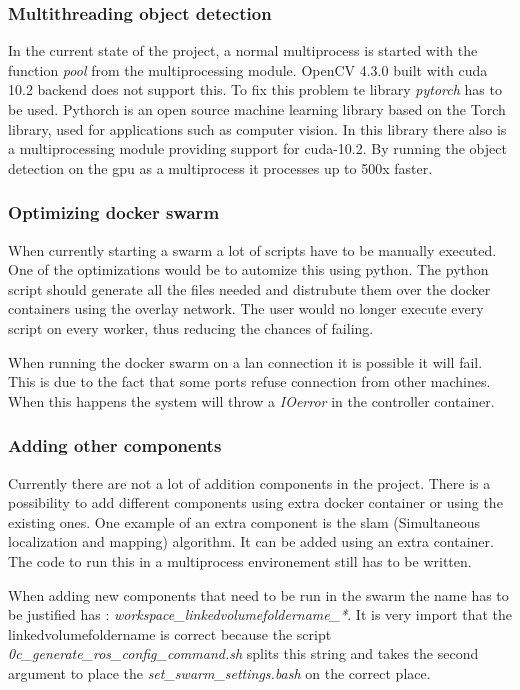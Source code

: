 \subsubsection{Multithreading object detection}

In the current state of the project, a normal multiprocess is started with the function \textit{pool} from 
the multiprocessing module. OpenCV 4.3.0 built with \acs{cuda} 10.2 backend does not support this. To fix this problem
te library \textit{pytorch} has to be used. Pythorch is an open source machine learning library based on the 
Torch library, used for applications such as computer vision. In this library there also is a multiprocessing module
providing support for \acs{cuda}-10.2. By running the object detection on the \acs{gpu} as a multiprocess it processes up to 500x faster.

\subsubsection{Optimizing docker swarm}

When currently starting a swarm a lot of scripts have to be manually executed. One of the optimizations would be to automize this using 
python. The python script should generate all the files needed and distrubute them over the docker containers using the overlay network. 
The user would no longer execute every script on every worker, thus reducing the chances of failing.

When running the docker swarm on a \acs{lan} connection it is possible it will fail. This is due to the fact that some ports refuse connection 
from other machines. When this happens the system will throw a \textit{IOerror} in the controller container.

\subsubsection{Adding other components}

Currently there are not a lot of addition components in the project. There is a possibility to add different components 
using extra docker container or using the existing ones. One example of an extra component is the \acs{slam} 
(Simultaneous localization and mapping) algorithm. It can be added using an extra container. The code to run this in a 
multiprocess environement still has to be written.

When adding new components that need to be run in the swarm the name has to be justified has : \textit{workspace\_linkedvolumefoldername\_*}.
It is very import that the linkedvolumefoldername is correct because the script \textit{0c\_generate\_ros\_config\_command.sh} splits this string and 
takes the second argument to place the  \textit{set\_swarm\_settings.bash} on the correct place.

